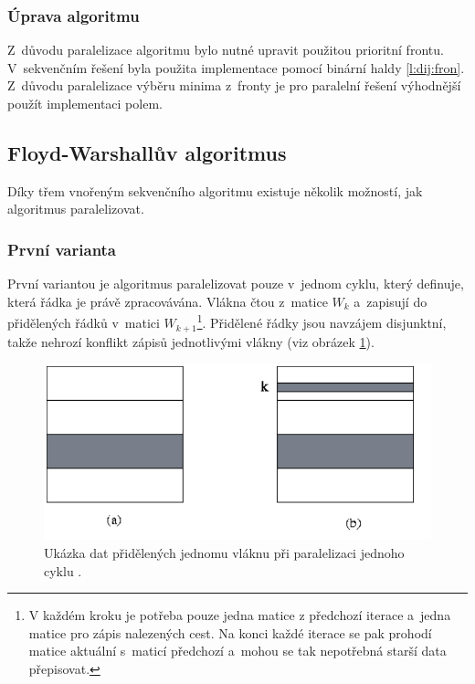 \subsubsection{Úprava algoritmu}
Z~důvodu paralelizace algoritmu bylo nutné upravit použitou prioritní frontu. V~sekvenčním řešení byla použita implementace pomocí binární haldy \ref{l:dij:fron}. Z~důvodu paralelizace výběru minima z~fronty je pro paralelní řešení výhodnější použít implementaci polem.


\subsection{Floyd-Warshallův algoritmus}
Díky třem vnořeným sekvenčního algoritmu existuje několik možností, jak algoritmus paralelizovat.

\subsubsection{První varianta}
První variantou je algoritmus paralelizovat pouze v~jednom cyklu, který definuje, která řádka je právě zpracovávána. 
Vlákna čtou z~matice $W_k$ a~zapisují do přidělených řádků v~matici $W_{k+1}$\footnote{V každém kroku je
potřeba pouze jedna matice z předchozí iterace a~jedna matice pro zápis nalezených cest. Na konci každé iterace 
se pak prohodí matice aktuální s~maticí předchozí a~mohou se tak nepotřebná starší data přepisovat.}. Přidělené řádky 
jsou navzájem disjunktní, takže nehrozí konflikt zápisů jednotlivými vlákny (viz obrázek \ref{f:fw:omp}).


\begin{figure}
    \centering
    \includegraphics[width=\textwidth]{floyd-openmp}
    \caption{Ukázka dat přidělených jednomu vláknu při paralelizaci jednoho cyklu \cite{w:fw:omp}.}
    \label{f:fw:omp}
\end{figure}


